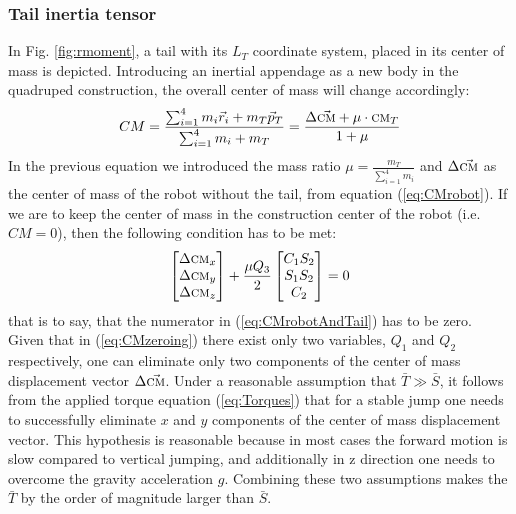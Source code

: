 \subsubsection{Tail inertia tensor}
In Fig. \ref{fig:rmoment}, a tail with its ${L_T}$ coordinate system, placed in its center of mass is depicted. Introducing an inertial appendage as a new body in the quadruped construction, the overall center of mass will change accordingly:
\begin{equation}\label{eq:CMrobotAndTail}
CM=\frac{\sum_{i=1}^{4}m_i\vec{r}_i+m_T\vec{p}_T}{\sum_{i=1}^{4}m_i+m_T}= \frac{\Delta\vec{\textsc{cm}}+\mu\cdot\textsc{cm}_T}{1+\mu}
\end{equation}
In the previous equation we introduced the mass ratio $\mu=\frac{m_T}{\sum_{i=1}^{4}m_i}$ and $\Delta\vec{\textsc{cm}}$ as the center of mass of the robot without the tail, from equation (\ref{eq:CMrobot}). If we are to keep the center of mass in the construction center of the robot (i.e. $CM=0$), then the following condition has to be met:
\begin{equation}\label{eq:CMzeroing}
\begin{bmatrix}
\Delta \textsc{cm}_x\\ 
\Delta \textsc{cm}_y\\ 
\Delta \textsc{cm}_z
\end{bmatrix}+
\frac{\mu Q_3}{2}\begin{bmatrix}
C_1S_2\\ 
S_1S_2\\ 
C_2
\end{bmatrix}=0
\end{equation}
that is to say, that the numerator in (\ref{eq:CMrobotAndTail}) has to be zero. Given that in (\ref{eq:CMzeroing}) there exist only two variables, $Q_1$ and $Q_2$ respectively, one can eliminate only two components of the center of mass displacement vector $\Delta \vec{\textsc{cm}}$. Under a reasonable assumption that $\bar{T}\gg \bar{S}$, it follows from the applied torque equation (\ref{eq:Torques}) that for a stable jump one needs to successfully eliminate $x$ and $y$ components of the center of mass displacement vector. This hypothesis is reasonable because in most cases the forward motion is slow compared to vertical jumping, and additionally in z direction one needs to overcome the gravity acceleration $g$. Combining these two assumptions makes the $\bar{T}$ by the order of magnitude larger than $\bar{S}$.

